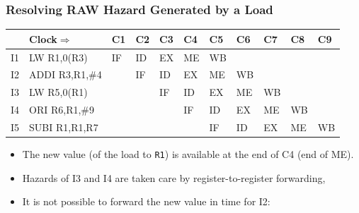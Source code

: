 \documentclass{beamer}
\renewcommand{\emph}[1]{\textcolor{structure}{#1}}
\newcommand{\emp}[1]{\textcolor{DikuRed}{ #1}}
\begin{document}
\begin{frame}[fragile,t]
\frametitle{Resolving RAW Hazard Generated by a Load}

\bigskip

\begin{scriptsize}
\begin{tabular}{lllllllllll}
\hline
   & Clock$\Rightarrow$ & C1 & C2 & C3 & C4 & C5 & C6 & C7 & C8 & C9 \\\hline
I1 & LW   R1,0(R3)      & IF & ID & EX & ME & \emp{WB}&    &    &    &    \\
I2 & ADDI R3,R1,\#4     &    & IF & ID & \alert{EX} & ME & WB &    &    &    \\
I3 & LW   R5,0(R1)      &    &    & IF & ID & \emph{EX} & ME & WB &    &    \\
I4 & ORI  R6,R1,\#9     &    &    &    & IF & ID & \emph{EX} & ME & WB &    \\
I5 & SUBI R1,R1,R7      &    &    &    &    & IF & ID & EX & ME & WB \\\hline
\end{tabular}
\end{scriptsize} 
\pause

\begin{scriptsize}
\begin{itemize}

\item The new value (of the load to {\tt R1}) is available at the end of C4 (end of ME).
\item Hazards of I3 and I4 are taken care by register-to-register forwarding,
\item \alert{It is not possible to forward the new value in time for I2}:
\begin{itemize}
\end{itemize}
\end{itemize}
\end{scriptsize}


\end{frame}
\end{document}
